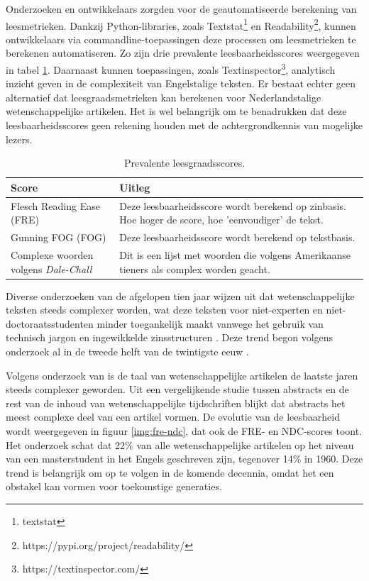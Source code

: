 \medspace

Onderzoeken en ontwikkelaars zorgden voor de geautomatiseerde berekening van leesmetrieken. Dankzij Python-libraries, zoals Textstat\footnote{textstat} en Readability\footnote{https://pypi.org/project/readability/}, kunnen ontwikkelaars via commandline-toepassingen deze processen om leesmetrieken te berekenen automatiseren. Zo zijn drie prevalente leesbaarheidsscores weergegeven in tabel \ref{table:readability-scores}. Daarnaast kunnen toepassingen, zoals Textinspector\footnote{https://textinspector.com/}, analytisch inzicht geven in de complexiteit van Engelstalige teksten. Er bestaat echter geen alternatief dat leesgraadsmetrieken kan berekenen voor Nederlandstalige wetenschappelijke artikelen. Het is wel belangrijk om te benadrukken dat deze leesbaarheidsscores geen rekening houden met de achtergrondkennis van mogelijke lezers.

\begin{center}
	\begin{table}[H]
	\begin{tabular}{ | m{5cm} | m{10cm} | } 
		\hline
		\textbf{Score} & \textbf{Uitleg} \\ 
		\hline
		Flesch Reading Ease (FRE) & Deze leesbaarheidsscore wordt berekend op zinbasis. Hoe hoger de score, hoe 'eenvoudiger' de tekst. \\
		\hline
		Gunning FOG (FOG) & Deze leesbaarheidsscore wordt berekend op tekstbasis. \\
		\hline
		Complexe woorden volgens \textit{Dale-Chall} & Dit is een lijst met woorden die volgens Amerikaanse tieners als complex worden geacht. \\
		\hline
	\end{tabular}
	\caption{Prevalente leesgraadsscores.}
	\label{table:readability-scores}
	\end{table}
\end{center}

Diverse onderzoeken van de afgelopen tien jaar wijzen uit dat wetenschappelijke teksten steeds complexer worden, wat deze teksten voor niet-experten en niet-doctoraatsstudenten minder toegankelijk maakt vanwege het gebruik van technisch jargon en ingewikkelde zinsstructuren \autocite{Ball2017, PlavenSigray2017, Jones2019}. Deze trend begon volgens onderzoek al in de tweede helft van de twintigste eeuw \autocite{Hayes1992}.

\medspace

Volgens onderzoek van \textcite{PlavenSigray2017} is de taal van wetenschappelijke artikelen de laatste jaren steeds complexer geworden. Uit een vergelijkende studie tussen abstracts en de rest van de inhoud van wetenschappelijke tijdschriften blijkt dat abstracts het meest complexe deel van een artikel vormen. De evolutie van de leesbaarheid wordt weergegeven in figuur \ref{img:fre-ndc}, dat ook de FRE- en NDC-scores toont. Het onderzoek schat dat 22\% van alle wetenschappelijke artikelen op het niveau van een masterstudent in het Engels geschreven zijn, tegenover 14\% in 1960. Deze trend is belangrijk om op te volgen in de komende decennia, omdat het een obstakel kan vormen voor toekomstige generaties.

